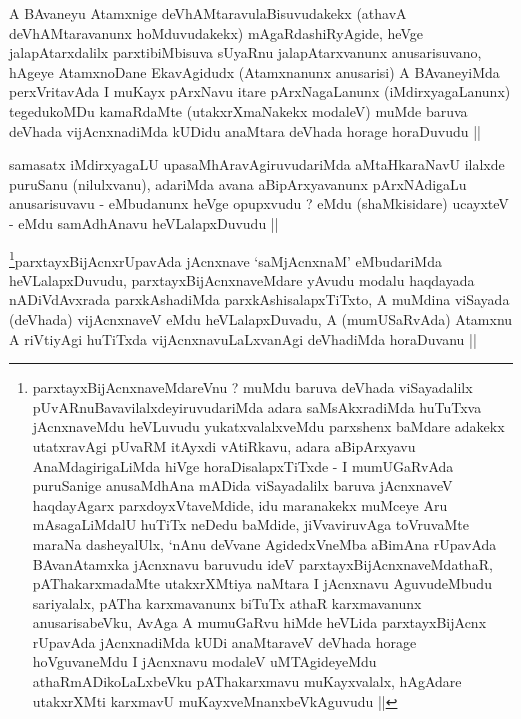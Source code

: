 
\begin{artha}
A BAvaneyu Atamxnige deVhAMtaravulaBisuvudakekx (athavA
deVhAMtaravanunx hoMduvudakekx) mAgaRdashiRyAgide, heVge
jalapAtarxdalilx parxtibiMbisuva sUyaRnu jalapAtarxvanunx
anusarisuvano, hAgeye AtamxnoDane EkavAgidudx (Atamxnanunx anusarisi)
A BAvaneyiMda perxVritavAda I muKayx pArxNavu itare pArxNagaLanunx
(iMdirxyagaLanunx) tegedukoMDu kamaRdaMte (utakxrXmaNakekx modaleV)
muMde baruva deVhada vijAcnxnadiMda kUDidu anaMtara deVhada horage
horaDuvudu ||
\end{artha}

\begin{artha}
samasatx iMdirxyagaLU upasaMhAravAgiruvudariMda aMtaHkaraNavU ilalxde
puruSanu (nilulxvanu), adariMda avana aBipArxyavanunx pArxNAdigaLu
anusarisuvavu - eMbudanunx heVge opupxvudu ? eMdu (shaMkisidare)
ucayxteV - eMdu samAdhAnavu heVLalapxDuvudu ||
\end{artha}


\begin{artha}
\footnote{parxtayxBijAcnxnaveMdareVnu ? muMdu baruva deVhada
  viSayadalilx pUvARnuBavavilalxdeyiruvudariMda adara saMsAkxradiMda
  huTuTxva jAcnxnaveMdu heVLuvudu yukatxvalalxveMdu parxshenx baMdare
  adakekx utatxravAgi pUvaRM itAyxdi vAtiRkavu, adara aBipArxyavu
  AnaMdagirigaLiMda hiVge horaDisalapxTiTxde - I mumUGaRvAda
  puruSanige anusaMdhAna mADida viSayadalilx baruva jAcnxnaveV
  haqdayAgarx parxdoyxVtaveMdide, idu maranakekx muMceye Aru
  mAsagaLiMdalU huTiTx neDedu baMdide, jiVvaviruvAga toVruvaMte maraNa
  dasheyalUlx, `nAnu deVvane AgidedxVneMba aBimAna rUpavAda
  BAvanAtamxka jAcnxnavu baruvudu ideV parxtayxBijAcnxnaveMdathaR,
  pAThakarxmadaMte utakxrXMtiya naMtara I jAcnxnavu AguvudeMbudu
  sariyalalx, pATha karxmavanunx biTuTx athaR karxmavanunx
  anusarisabeVku, AvAga A mumuGaRvu hiMde heVLida parxtayxBijAcnx
  rUpavAda jAcnxnadiMda kUDi anaMtaraveV deVhada horage hoVguvaneMdu I
  jAcnxnavu modaleV uMTAgideyeMdu athaRmADikoLaLxbeVku pAThakarxmavu
  muKayxvalalx, hAgAdare utakxrXMti karxmavU muKayxveMnanxbeVkAguvudu ||}parxtayxBijAcnxrUpavAda jAcnxnave `saMjAcnxnaM' eMbudariMda
heVLalapxDuvudu, parxtayxBijAcnxnaveMdare yAvudu modalu haqdayada
nADiVdAvxrada parxkAshadiMda parxkAshisalapxTiTxto, A muMdina viSayada
(deVhada) vijAcnxnaveV eMdu heVLalapxDuvadu, A (mumUSaRvAda) Atamxnu A
riVtiyAgi huTiTxda vijAcnxnavuLaLxvanAgi deVhadiMda horaDuvanu ||
\end{artha}

